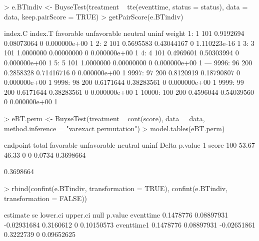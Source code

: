 \documentclass[12pt]{article}
\theoremstyle{definition}
\begin{document}
\begin{Rcode}
> e.BTindiv <- BuyseTest(treatment ~ tte(eventtime, status = status),
                       data = data, keep.pairScore = TRUE)
> getPairScore(e.BTindiv)
\end{Rcode}
\begin{Routput}
       index.C index.T favorable unfavorable neutral        uninf weight
    1:       1     101 0.9192694  0.08073064       0 0.000000e+00      1
    2:       2     101 0.5695583  0.43044167       0 1.110223e-16      1
    3:       3     101 1.0000000  0.00000000       0 0.000000e+00      1
    4:       4     101 0.4969601  0.50303994       0 0.000000e+00      1
    5:       5     101 1.0000000  0.00000000       0 0.000000e+00      1
   ---                                                                  
 9996:      96     200 0.2858328  0.71416716       0 0.000000e+00      1
 9997:      97     200 0.8120919  0.18790807       0 0.000000e+00      1
 9998:      98     200 0.6171644  0.38283561       0 0.000000e+00      1
 9999:      99     200 0.6171644  0.38283561       0 0.000000e+00      1
10000:     100     200 0.4596044  0.54039560       0 0.000000e+00      1
\end{Routput}


\begin{Rcode}
> eBT.perm <- BuyseTest(treatment ~ cont(score), data = data,
                      method.inference = "varexact permutation")
> model.tables(eBT.perm)
\end{Rcode}
\begin{Routput}
  endpoint total favorable unfavorable neutral uninf  Delta   p.value
1    score   100     53.67       46.33       0     0 0.0734 0.3698664
\end{Routput}


\begin{Routput}
0.3698664
\end{Routput}

\clearpage

\begin{Rcode}
> rbind(confint(e.BTindiv, transformation = TRUE),
        confint(e.BTindiv, transformation = FALSE)) 
\end{Rcode}
       
\begin{Routput}
            estimate         se    lower.ci  upper.ci null    p.value
eventtime  0.1478776 0.08897931 -0.02931684 0.3160612    0 0.10150573
eventtime1 0.1478776 0.08897931 -0.02651861 0.3222739    0 0.09652625
\end{Routput}
\end{document}
